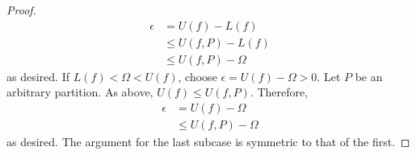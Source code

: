 \documentclass[../main.tex]{subfiles}
\begin{document}
\begin{lemma}
\begin{proof}
        \begin{align*}
            \epsilon &= U(f)-L(f)\\
            &\leq U(f,P)-L(f)\\
            &\leq U(f,P)-\Omega
        \end{align*}
        as desired. If $L(f)<\Omega<U(f)$, choose $\epsilon=U(f)-\Omega>0$. Let $P$ be an arbitrary partition. As above, $U(f)\leq U(f,P)$. Therefore,
        \begin{align*}
            \epsilon &= U(f)-\Omega\\
            &\leq U(f,P)-\Omega
        \end{align*}
        as desired. The argument for the last subcase is symmetric to that of the first.
    \end{proof}
\end{lemma}
\end{document}
